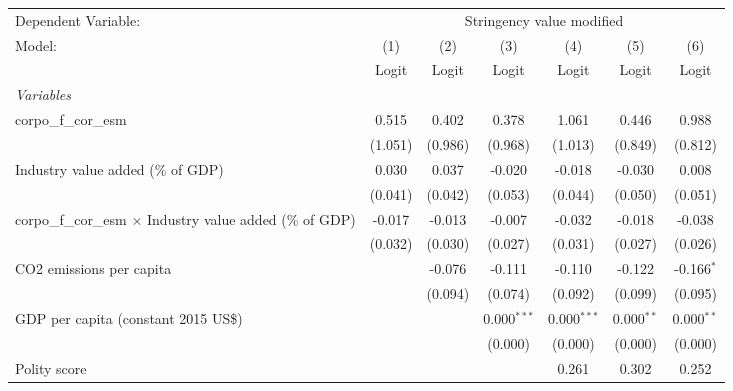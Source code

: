 
\begingroup
\centering
\begin{tabular}{lcccccc}
   \toprule
   Dependent Variable: & \multicolumn{6}{c}{Stringency value modified}\\
   Model:                                                            & (1)     & (2)     & (3)           & (4)           & (5)          & (6)\\  
                                                                     &  Logit  & Logit   & Logit         & Logit         & Logit        & Logit\\  
   \midrule
   \emph{Variables}\\
   corpo\_f\_cor\_esm                                                & 0.515   & 0.402   & 0.378         & 1.061         & 0.446        & 0.988\\   
                                                                     & (1.051) & (0.986) & (0.968)       & (1.013)       & (0.849)      & (0.812)\\   
   Industry value added (\% of GDP)                                  & 0.030   & 0.037   & -0.020        & -0.018        & -0.030       & 0.008\\   
                                                                     & (0.041) & (0.042) & (0.053)       & (0.044)       & (0.050)      & (0.051)\\   
   corpo\_f\_cor\_esm $\times$ Industry value added (\% of GDP)      & -0.017  & -0.013  & -0.007        & -0.032        & -0.018       & -0.038\\   
                                                                     & (0.032) & (0.030) & (0.027)       & (0.031)       & (0.027)      & (0.026)\\   
   CO2 emissions per capita                                          &         & -0.076  & -0.111        & -0.110        & -0.122       & -0.166$^{*}$\\   
                                                                     &         & (0.094) & (0.074)       & (0.092)       & (0.099)      & (0.095)\\   
   GDP per capita (constant 2015 US\$)                               &         &         & 0.000$^{***}$ & 0.000$^{***}$ & 0.000$^{**}$ & 0.000$^{**}$\\   
                                                                     &         &         & (0.000)       & (0.000)       & (0.000)      & (0.000)\\   
   Polity score                                                      &         &         &               & 0.261         & 0.302        & 0.252\\   

\end{tabular}
